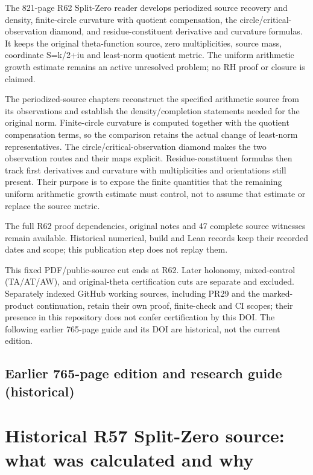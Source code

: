 \documentclass[
]{article}
\begin{document}
The 821-page R62 Split-Zero reader develops periodized source recovery
and density, finite-circle curvature with quotient compensation, the
circle/critical-observation diamond, and residue-constituent derivative
and curvature formulas. It keeps the original theta-function source,
zero multiplicities, source mass, coordinate S=k/2+iu and least-norm
quotient metric. The uniform arithmetic growth estimate remains an
active unresolved problem; no RH proof or closure is claimed.

The periodized-source chapters reconstruct the specified arithmetic
source from its observations and establish the density/completion
statements needed for the original norm. Finite-circle curvature is
computed together with the quotient compensation terms, so the
comparison retains the actual change of least-norm representatives. The
circle/critical-observation diamond makes the two observation routes and
their maps explicit. Residue-constituent formulas then track first
derivatives and curvature with multiplicities and orientations still
present. Their purpose is to expose the finite quantities that the
remaining uniform arithmetic growth estimate must control, not to assume
that estimate or replace the source metric.

The full R62 proof dependencies, original notes and 47 complete source
witnesses remain available. Historical numerical, build and Lean records
keep their recorded dates and scope; this publication step does not
replay them.

This fixed PDF/public-source cut ends at R62. Later holonomy,
mixed-control (TA/AT/AW), and original-theta certification cuts are
separate and excluded. Separately indexed GitHub working sources,
including PR29 and the marked-product continuation, retain their own
proof, finite-check and CI scopes; their presence in this repository
does not confer certification by this DOI. The following earlier
765-page guide and its DOI are historical, not the current edition.

\subsection{Earlier 765-page edition and research guide
(historical)}\label{earlier-765-page-edition-and-research-guide-historical}

\section{Historical R57 Split-Zero source: what was calculated and
why}\label{historical-r57-split-zero-source-what-was-calculated-and-why}
\end{document}
